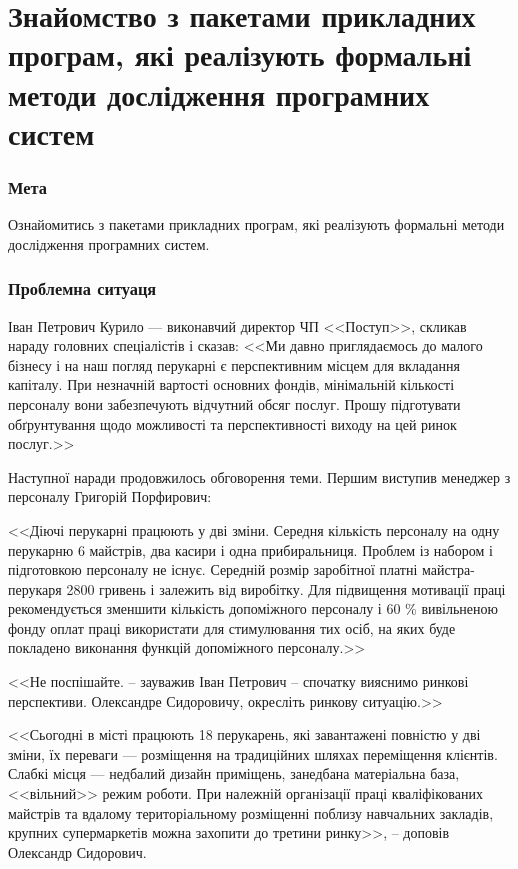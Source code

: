 



\newcommand{\labnumber}{1} %



\graphicspath{{figures/}}


\Ukrainian


\addtocounter{page}{1}

\section*{Знайомство з пакетами прикладних програм, які реалізують формальні методи дослідження програмних систем}
\subsubsection*{Мета}
Ознайомитись з пакетами прикладних програм, які реалізують формальні методи дослідження програмних систем.
\subsubsection*{Проблемна ситуаця}
Іван Петрович Курило --- виконавчий директор ЧП <<Поступ>>, скликав нараду головних спеціалістів і сказав: <<Ми давно приглядаємось до малого бізнесу і на наш погляд перукарні є перспективним місцем для вкладання капіталу. При незначній вартості основних фондів, мінімальній кількості персоналу вони забезпечують відчутний обсяг послуг. Прошу підготувати обґрунтування щодо можливості та перспективності виходу на цей ринок послуг.>>

Наступної наради продовжилось обговорення теми. Першим виступив менеджер з персоналу Григорій Порфирович:

<<Діючі перукарні працюють у дві зміни. Середня кількість персоналу на одну перукарню 6 майстрів, два касири і одна прибиральниця. Проблем із набором і підготовкою персоналу не існує. Середній розмір заробітної платні майстра-перукаря 2800 гривень і залежить від виробітку. Для підвищення мотивації праці рекомендується зменшити кількість допоміжного персоналу і 60 \% вивільненою фонду оплат праці використати для стимулювання тих осіб, на яких буде покладено виконання функцій допоміжного персоналу.>>

<<Не поспішайте. -- зауважив Іван Петрович -- спочатку вияснимо ринкові перспективи. Олександре Сидоровичу, окресліть ринкову ситуацію.>>

<<Сьогодні в місті працюють 18 перукарень, які завантажені повністю у дві зміни, їх переваги --- розміщення на традиційних шляхах переміщення клієнтів. Слабкі місця --- недбалий дизайн приміщень, занедбана матеріальна база, <<вільний>> режим роботи. При належній організації праці кваліфікованих майстрів та вдалому територіальному розміщенні поблизу навчальних закладів, крупних супермаркетів можна захопити до третини ринку>>, -- доповів Олександр Сидорович.


